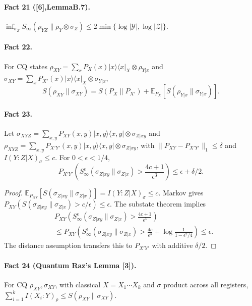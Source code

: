 \documentclass[10pt,a4paper]{article}
\providecommand{\ket}[1]{\lvert#1\rangle}
\providecommand{\bra}[1]{\langle#1\rvert}
\providecommand{\proj}[1]{\ket{#1}\bra{#1}}
\begin{document}
\paragraph{Fact 21 ([6],LemmaB.7).} $\inf_{\sigma_Z}S_\infty(\rho_{YZ}\|\rho_Y\otimes\sigma_Z)\le2\min\{\log|\mathcal Y|,\log|\mathcal Z|\}$.
\paragraph{Fact 22.} For CQ states $\rho_{XY}=\sum_xP_X(x)\proj{x}_X\otimes\rho_{Y|x}$ and $\sigma_{XY}=\sum_xP_{X'}(x)\proj{x}_X\otimes\sigma_{Y|x}$,
\[S(\rho_{XY}\|\sigma_{XY})=S(P_X\|P_{X'})+\mathbb E_{P_X}[S(\rho_{Y|x}\|\sigma_{Y|x})].\]
\paragraph{Fact 23.} Let $\sigma_{XYZ}=\sum_{x,y}P_{XY}(x,y)\proj{x,y}\otimes\sigma_{Z|xy}$ and $\rho_{XYZ}=\sum_{x,y}P_{X'Y'}(x,y)\proj{x,y}\otimes\sigma_{Z|xy}$, with $\|P_{XY}-P_{X'Y'}\|_1\le\delta$ and $I(Y:Z|X)_\sigma\le c$. For $0<\epsilon<1/4$,
\[P_{X'Y'}\left(S_\infty^\epsilon(\sigma_{Z|xy}\|\sigma_{Z|x})>\frac{4c+1}{\epsilon^3}\right)\le\epsilon+\delta/2.\]
\begin{proof}$\mathbb E_{P_{XY}}[S(\sigma_{Z|xy}\|\sigma_{Z|x})]=I(Y:Z|X)_\sigma\le c$. Markov gives $P_{XY}(S(\sigma_{Z|xy}\|\sigma_{Z|x})>c/\epsilon)\le\epsilon$. The substate theorem implies
\begin{align*}&P_{XY}\left(S_\infty^\epsilon(\sigma_{Z|xy}\|\sigma_{Z|x})>\frac{4c+1}{\epsilon^3}\right)\\&\le P_{XY}\left(S_\infty^\epsilon(\sigma_{Z|xy}\|\sigma_{Z|x})>\frac{4c}{\epsilon^3}+\log\frac1{1-\epsilon^2/4}\right)\le\epsilon.\end{align*}
The distance assumption transfers this to $P_{X'Y'}$ with additive $\delta/2$.\end{proof}
\paragraph{Fact 24 (Quantum Raz's Lemma [3]).} For CQ $\rho_{XY},\sigma_{XY}$, with classical $X=X_1\cdots X_k$ and $\sigma$ product across all registers, $\sum_{i=1}^kI(X_i:Y)_\rho\le S(\rho_{XY}\|\sigma_{XY})$.
\end{document}
